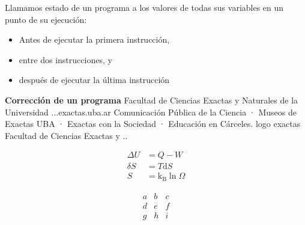 
\begin{shaded}
Llamamos estado de un programa a los valores de todas sus
variables en un punto de su ejecución:
\begin{itemize}
\item Antes de ejecutar la primera instrucción,
\item entre dos instrucciones, y
\item después de ejecutar la última instrucción
\end{itemize}
\end{shaded}

\textbf{Corrección de un programa}
Facultad de Ciencias Exactas y Naturales de la Universidad ...exactas.uba.ar
Comunicación Pública de la Ciencia · Museos de Exactas UBA · Exactas con la Sociedad · Educación en Cárceles. logo exactas Facultad de Ciencias Exactas y ..

\begin{align}
 \Delta U &= Q -W \\
 \delta S &= T \mathrm{d}S \\
 S &= \mathrm{k_B}\ln\Omega
\end{align}

\begin{equation}
 \begin{matrix}
  a & b & c \\
  d & e & f \\
  g & h & i
 \end{matrix}
\end{equation}